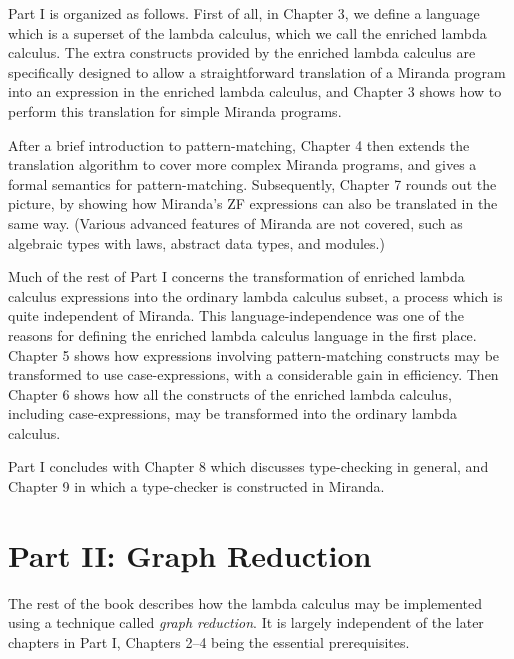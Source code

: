 Part I is organized as follows. First of all, in Chapter 3, we define a language
which is a superset of the lambda calculus, which we call the enriched lambda
calculus. The extra constructs provided by the enriched lambda calculus are
specifically designed to allow a straightforward translation of a Miranda
program into an expression in the enriched lambda calculus, and Chapter 3
shows how to perform this translation for simple Miranda programs.

After a brief introduction to pattern-matching, Chapter 4 then extends the
translation algorithm to cover more complex Miranda programs, and gives a
formal semantics for pattern-matching. Subsequently, Chapter 7 rounds out
the picture, by showing how Miranda's ZF expressions can also be translated
in the same way. (Various advanced features of Miranda are not covered,
such as algebraic types with laws, abstract data types, and modules.)

Much of the rest of Part I concerns the transformation of enriched lambda
calculus expressions into the ordinary lambda calculus subset, a process which
is quite independent of Miranda. This language-independence was one of the
reasons for defining the enriched lambda calculus language in the first place.
Chapter 5 shows how expressions involving pattern-matching constructs may
be transformed to use case-expressions, with a considerable gain in efficiency.
Then Chapter 6 shows how all the constructs of the enriched lambda calculus,
including case-expressions, may be transformed into the ordinary lambda
calculus.

Part I concludes with Chapter 8 which discusses type-checking in general,
and Chapter 9 in which a type-checker is constructed in Miranda.

\section{Part II: Graph Reduction}

The rest of the book describes how the lambda calculus may be implemented
using a technique called \textit{graph reduction}. It is largely independent of the later
chapters in Part I, Chapters 2--4 being the essential prerequisites.

